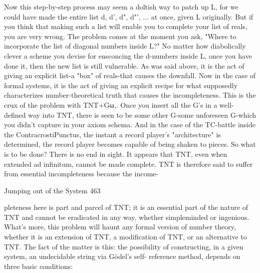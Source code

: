 {Now this step-by-step process may seem a doltish way to patch up L, for we could have
made the entire list d, d', d", d"', ... at once, given L originally. But if you think that
making such a list will enable you to complete your list of reals, you are very wrong. The
problem comes at the moment you ask, "Where to incorporate the list of diagonal
numbers inside L?" No matter how diabolically clever a scheme you devise for
ensconcing the d-numbers inside L, once you have done it, then the new list is still
vulnerable. As was said above, it is the act of giving an explicit list-a "box" of reals-that
causes the downfall.
        Now in the case of formal systems, it is the act of giving an explicit recipe for
what supposedly characterizes number-theoretical truth that causes the incompleteness.
This is the crux of the problem with TNT+Gω,. Once you insert all the G's in a well-
defined way into TNT, there is seen to be some other G-some unforeseen G-which you
didn't capture in your axiom schema. And in the case of the TC-battle inside the
ContracrostiPunctus, the instant a record player's "architecture" is determined, the record
player becomes capable of being shaken to pieces.
        So what is to be done? There is no end in sight. It appears that TNT, even when
extended ad infinitum, cannot be made complete. TNT is therefore said to suffer from
essential incompleteness because the income-




Jumping out of the System                                                                463

pleteness here is part and parcel of TNT; it is an essential part of the nature of TNT and
cannot be eradicated in any way, whether simpleminded or ingenious. What's more, this
problem will haunt any formal version of number theory, whether it is an extension of
TNT, a modification of TNT, or an alternative to TNT. The fact of the matter is this: the
possibility of constructing, in a given system, an undecidable string via Gödel’s self-
reference method, depends on three basic conditions:

}
